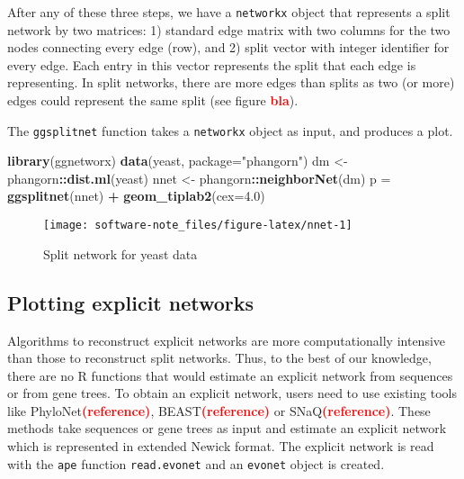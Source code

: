 \documentclass[]{IEEEtran}
\newenvironment{Shaded}{\begin{snugshade}}{\end{snugshade}}
\newcommand{\DataTypeTok}[1]{\textcolor[rgb]{0.13,0.29,0.53}{#1}}
\newcommand{\FloatTok}[1]{\textcolor[rgb]{0.00,0.00,0.81}{#1}}
\newcommand{\KeywordTok}[1]{\textcolor[rgb]{0.13,0.29,0.53}{\textbf{#1}}}
\newcommand{\NormalTok}[1]{#1}
\newcommand{\OperatorTok}[1]{\textcolor[rgb]{0.81,0.36,0.00}{\textbf{#1}}}
\newcommand{\StringTok}[1]{\textcolor[rgb]{0.31,0.60,0.02}{#1}}
\begin{document}
After any of these three steps, we have a \texttt{networkx} object that
represents a split network by two matrices: 1) standard edge matrix with
two columns for the two nodes connecting every edge (row), and 2) split
vector with integer identifier for every edge. Each entry in this vector
represents the split that each edge is representing. In split networks,
there are more edges than splits as two (or more) edges could represent
the same split (see figure \textcolor{red}{\textbf{bla}}).

The \texttt{ggsplitnet} function takes a \texttt{networkx} object as
input, and produces a plot.

\begin{Shaded}
\begin{Highlighting}[]
\KeywordTok{library}\NormalTok{(ggnetworx)}
\KeywordTok{data}\NormalTok{(yeast, }\DataTypeTok{package=}\StringTok{"phangorn"}\NormalTok{)}
\NormalTok{dm <-}\StringTok{ }\NormalTok{phangorn}\OperatorTok{::}\KeywordTok{dist.ml}\NormalTok{(yeast) }
\NormalTok{nnet <-}\StringTok{ }\NormalTok{phangorn}\OperatorTok{::}\KeywordTok{neighborNet}\NormalTok{(dm)}
\NormalTok{p =}\StringTok{ }\KeywordTok{ggsplitnet}\NormalTok{(nnet) }\OperatorTok{+}\StringTok{ }\KeywordTok{geom_tiplab2}\NormalTok{(}\DataTypeTok{cex=}\FloatTok{4.0}\NormalTok{)}
\end{Highlighting}
\end{Shaded}

\begin{figure}[H]

{\centering \texttt{[image: software-note\_files/figure-latex/nnet-1]} 

}

\caption{Split network for yeast data}\label{fig:nnet}
\end{figure}

\hypertarget{plotting-explicit-networks}{%
\subsection{Plotting explicit
networks}\label{plotting-explicit-networks}}

Algorithms to reconstruct explicit networks are more computationally
intensive than those to reconstruct split networks. Thus, to the best of
our knowledge, there are no R functions that would estimate an explicit
network from sequences or from gene trees. To obtain an explicit
network, users need to use existing tools like
PhyloNet\textcolor{red}{\textbf{(reference)}},
BEAST\textcolor{red}{\textbf{(reference)}} or
SNaQ\textcolor{red}{\textbf{(reference)}}. These methods take sequences
or gene trees as input and estimate an explicit network which is
represented in extended Newick format. The explicit network is read with
the \texttt{ape} function \texttt{read.evonet} and an \texttt{evonet}
object is created.
\end{document}
